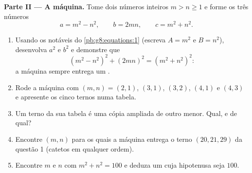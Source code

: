 \begin{problem}[{Problema de fim de semana --- triângulos retângulos de
lados inteiros e a identidade
$(m^2 - n^2)^2 + (2mn)^2 = (m^2 + n^2)^2$ que gera todos eles}]
\medskip
\noindent\textbf{Parte II --- A máquina.}
Tome dois números inteiros $m > n \geq 1$ e forme os três números
\[
a = m^2 - n^2,
\qquad
b = 2mn,
\qquad
c = m^2 + n^2 .
\]
\begin{enumerate}[resume]
  \item Usando os  notáveis do \cref{pb:g8:equations:1}
        (escreva $A = m^2$ e $B = n^2$), desenvolva $a^2$ e $b^2$ e
        demonstre que
        \[
        \left(m^2 - n^2\right)^2 + (2mn)^2
        = \left(m^2 + n^2\right)^2 :
        \]
        a máquina sempre entrega um .
  \item Rode a máquina com $(m, n) = (2, 1)$, $(3, 1)$, $(3, 2)$,
        $(4, 1)$ e $(4, 3)$ e apresente os cinco ternos numa tabela.
  \item Um terno da sua tabela é uma cópia ampliada de outro menor.
        Qual, e de qual?
  \item Encontre $(m, n)$ para os quais a máquina entrega o terno
        $(20, 21, 29)$ da questão 1 (catetos em qualquer ordem).
  \item Encontre $m$ e $n$ com $m^2 + n^2 = 100$ e deduza um  cuja hipotenusa seja $100$.
\end{enumerate}


\end{problem}
